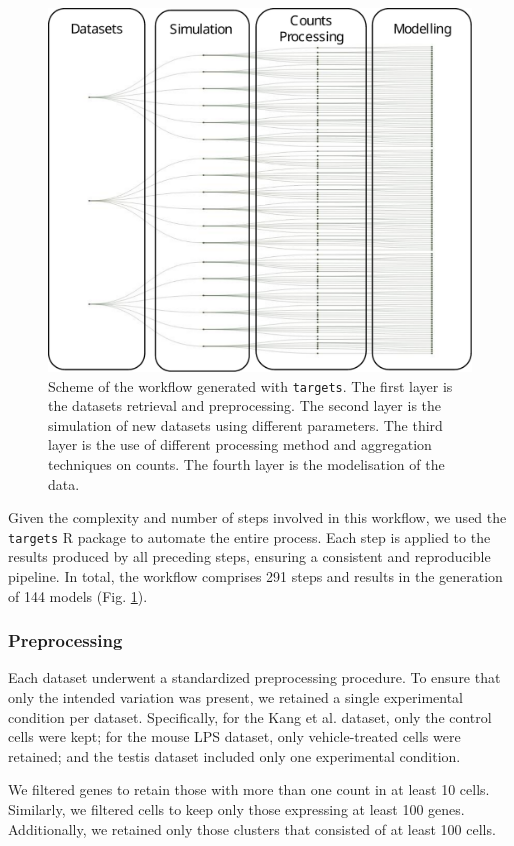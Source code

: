 \documentclass[a4paper, 11pt, twocolumn]{article}
\begin{document}
\begin{multicols}{2}
\begin{figure}[H]
	\centering
	\includegraphics[width=0.7\columnwidth]{img/workflowCut.pdf}
	\caption{{\footnotesize Scheme of the workflow generated with \texttt{targets}. The first layer is the datasets retrieval and preprocessing. The second layer is the simulation of new datasets using different parameters. The third layer is the use of different processing method and aggregation techniques on counts. The fourth layer is the modelisation of the data.}}
	\label{fig:workflow}
\end{figure}

Given the complexity and number of steps involved in this workflow, we used the \texttt{targets} R package \citep{targets} to automate the entire process. Each step is applied to the results produced by all preceding steps, ensuring a consistent and reproducible pipeline. In total, the workflow comprises 291 steps and results in the generation of 144 models (Fig. \ref{fig:workflow}).

\subsubsection{Preprocessing}

Each dataset underwent a standardized preprocessing procedure. To ensure that only the intended variation was present, we retained a single experimental condition per dataset. Specifically, for the Kang et al. dataset, only the control cells were kept; for the mouse LPS dataset, only vehicle-treated cells were retained; and the testis dataset included only one experimental condition.

We filtered genes to retain those with more than one count in at least 10 cells. Similarly, we filtered cells to keep only those expressing at least 100 genes. Additionally, we retained only those clusters that consisted of at least 100 cells.


\end{multicols}
\end{document}
